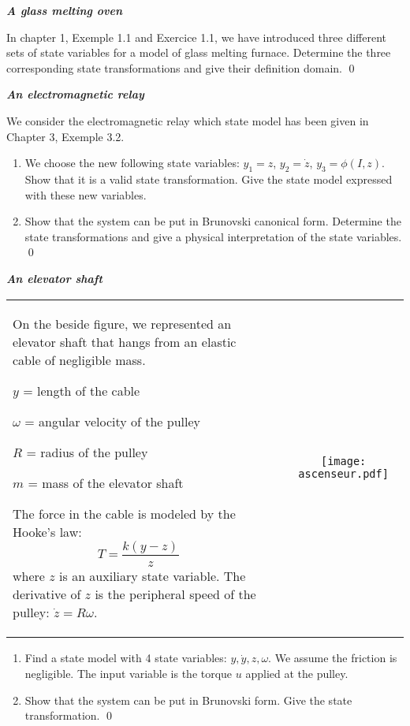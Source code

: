\begin{exercice}{\bf \em A glass melting oven}

In chapter 1, Exemple 1.1 and Exercice 1.1, we have introduced three different sets of state variables for a model of glass melting furnace. 
Determine the three corresponding state transformations and give their definition domain. \qed

\end{exercice}
\vv


\begin{exercice}{\bf \em An electromagnetic relay}

We consider the electromagnetic relay which state model has been given in Chapter 3, Exemple 3.2.
\begin{enumerate}
\item We choose the new following state variables: $y_1 = z$, $y_2 = \dot z$, $y_3 = \phi(I,z)$. Show that it is a valid state transformation. Give the state model expressed with these new variables.
\item Show that the system can be put in Brunovski canonical form. Determine the state transformations and give a physical interpretation of the state variables. \qed
\end{enumerate}
\end{exercice}
\vv

\begin{exercice}{\bf \em An elevator shaft}

\begin{tabular}{p{6.5cm}p{2mm}c}
\vspace{-3.2cm} 
On the beside figure, we represented an elevator shaft that hangs from an elastic cable of negligible mass.
\vspace{2mm}

\noindent {\bf Notations:}

$y$ = length of the cable

$\omega$ = angular velocity of the pulley

$R$ = radius of the pulley

$m$ = mass of the elevator shaft

\vspace{2mm}
\noindent The force in the cable is modeled by the Hooke's law:
\begin{equation*}
T = \frac{k(y - z)}{z}
\end{equation*}
where $z$ is an auxiliary state variable. The derivative of $z$ is the peripheral speed of the pulley: $\dot z = R \omega$.
& &
\parbox[c]{6cm}
{\texttt{[image: ascenseur.pdf]}}
\end{tabular}

\begin{enumerate}
\item Find a state model with 4 state variables: $y, \dot y, z, \omega$. We assume the friction is negligible. The input variable is the  torque $u$ applied at the pulley.
\item Show that the system can be put in Brunovski form. Give the state transformation. \qed
\end{enumerate}
\end{exercice}
\vv

